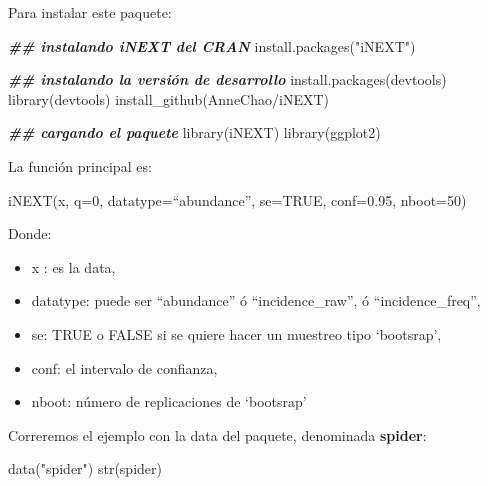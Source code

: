 \documentclass[
]{article}
\newenvironment{Shaded}{\begin{snugshade}}{\end{snugshade}}
\newcommand{\DocumentationTok}[1]{\textcolor[rgb]{0.56,0.35,0.01}{\textbf{\textit{#1}}}}
\newcommand{\FunctionTok}[1]{\textcolor[rgb]{0.00,0.00,0.00}{#1}}
\newcommand{\NormalTok}[1]{#1}
\newcommand{\StringTok}[1]{\textcolor[rgb]{0.31,0.60,0.02}{#1}}
\begin{document}
Para instalar este paquete:

\begin{Shaded}
\begin{Highlighting}[]
\DocumentationTok{\#\# instalando iNEXT del CRAN}
\FunctionTok{install.packages}\NormalTok{(}\StringTok{"iNEXT"}\NormalTok{)}

\DocumentationTok{\#\# instalando la versión de desarrollo}
\FunctionTok{install.packages}\NormalTok{(}\StringTok{\textquotesingle{}devtools\textquotesingle{}}\NormalTok{)}
\FunctionTok{library}\NormalTok{(devtools)}
\FunctionTok{install\_github}\NormalTok{(}\StringTok{\textquotesingle{}AnneChao/iNEXT\textquotesingle{}}\NormalTok{)}
\end{Highlighting}
\end{Shaded}

\begin{Shaded}
\begin{Highlighting}[]
\DocumentationTok{\#\# cargando el paquete}
\FunctionTok{library}\NormalTok{(iNEXT)}
\FunctionTok{library}\NormalTok{(ggplot2)}
\end{Highlighting}
\end{Shaded}

\hfill\break

La función principal es:

iNEXT(x, q=0, datatype=``abundance'', se=TRUE, conf=0.95, nboot=50)

Donde:

\begin{itemize}
\item
  x : es la data,
\item
  datatype: puede ser ``abundance'' ó ``incidence\_raw'', ó
  ``incidence\_freq'',
\item
  se: TRUE o FALSE si se quiere hacer un muestreo tipo `bootsrap',
\item
  conf: el intervalo de confianza,
\item
  nboot: número de replicaciones de `bootsrap'
\end{itemize}

Correremos el ejemplo con la data del paquete, denominada
\textbf{spider}:

\begin{Shaded}
\begin{Highlighting}[]
\FunctionTok{data}\NormalTok{(}\StringTok{"spider"}\NormalTok{)}
\FunctionTok{str}\NormalTok{(spider)}
\end{Highlighting}
\end{Shaded}
\end{document}
